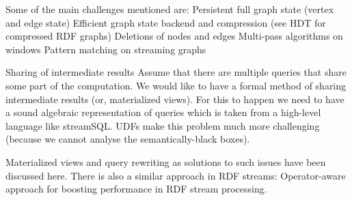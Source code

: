 Some of the main challenges mentioned are:
Persistent full graph state (vertex and edge state)
Efficient graph state backend and compression (see HDT for compressed RDF graphs)
Deletions of nodes and edges
Multi-pass algorithms on windows
Pattern matching on streaming graphs

Sharing of intermediate results
Assume that there are multiple queries that share some part of the computation. We would like to have a formal method of sharing intermediate results (or, materialized views). For this to  happen we need to have a sound algebraic representation of queries which is taken from a high-level language like streamSQL. UDFs make this problem much more challenging (because we cannot analyse the semantically-black boxes).

Materialized views and query rewriting as solutions to such issues have been discussed here. There is also a similar approach in RDF streams: Operator-aware approach for boosting performance in RDF stream processing.

